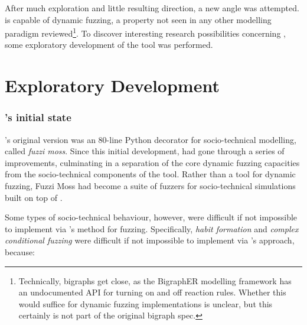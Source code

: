 \documentclass[draft]{article}
\begin{document}
After much exploration and little resulting direction, a new angle was
attempted. \pdsf{} is capable of dynamic fuzzing, a property not seen in any other
modelling paradigm reviewed\footnote{Technically, bigraphs get close, as the
  BigraphER\cite{BigraphER} modelling framework has an undocumented API for
  turning on and off reaction rules. Whether this would suffice for dynamic
  fuzzing implementations is unclear, but this certainly is not part of the
  original bigraph spec.}. To discover interesting research possibilities
concerning \pdsf{}, some exploratory development of the tool was performed.\par


\part{Exploratory Development}
\label{part:two}
\label{part:exploratory_development}
\section{\pdsf{}'s initial state}
\label{sec:pydysofu}
\pdsf{}'s original version was an 80-line Python decorator for socio-technical
modelling, called \emph{fuzzi moss}\cite{honours_thesis}. Since this
initial development, \pdsf{} had gone through a series of improvements,
culminating in a separation of the core dynamic fuzzing capacities from the
socio-technical components of the tool. Rather than a tool for dynamic fuzzing,
Fuzzi Moss had become a suite of fuzzers for socio-technical simulations built
on top of \pdsf{}.\par


Some types of socio-technical behaviour, however, were difficult if not
impossible to implement via \pdsf{}'s method for fuzzing. Specifically,
\emph{habit formation} and \emph{complex conditional fuzzing} were difficult if
not impossible to implement via \pdsf{}'s approach, because:
\end{document}
